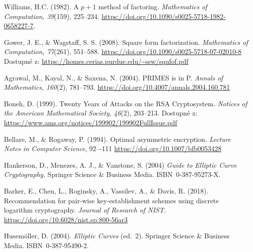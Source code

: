 \documentclass[
  program=infoi,
  biblatex=false,
  figures=true,
  glossaries,
  tables=false,
  sourcecodes=true,
  index
]{kidiplom}
\begin{document}
\begin{thebibliography}{99}
        Williams, H.C. (1982).
        A $p+1$ method of factoring.
        \emph{Mathematics of Computation, 39}(159), 225--234.
        \url{https://doi.org/10.1090/s0025-5718-1982-0658227-7}.

        Gower, J. E., \& Wagstaff, S. S. (2008).
        Square form factorization.
        \emph{Mathematics of Computation, 77}(261), 551–588.
        \url{https://doi.org/10.1090/s0025-5718-07-02010-8}
        Dostupné z: \url{https://homes.cerias.purdue.edu/~ssw/squfof.pdf}

        Agrawal, M., Kayal, N., \& Saxena, N. (2004).
        PRIMES is in P.
        \emph{Annals of Mathematics, 160}(2), 781–793.
        \url{https://doi.org/10.4007/annals.2004.160.781}

        Boneh, D. (1999).
        Twenty Years of Attacks on the RSA Cryptosystem.
        \emph{Notices of the American Mathematical Society, 46}(2), 203--213.
        Dostupné z: \url{https://www.ams.org/notices/199902/199902FullIssue.pdf}

        Bellare, M., \& Rogaway, P. (1994).
        Optimal asymmetric encryption.
        \emph{Lecture Notes in Computer Science}, 92–-111
        \url{https://doi.org/10.1007/bfb0053428}

        Hankerson, D., Menezes, A. J., \& Vanstone, S. (2004)
        \emph{Guide to Elliptic Curve Cryptography.}
        Springer Science \& Business Media.
        ISBN~0-387-95273-X.

        Barker, E., Chen, L., Roginsky, A., Vassilev, A., \& Davis, R. (2018).
        Recommendation for pair-wise key-establishment schemes using discrete logarithm cryptography.
        \emph{Journal of Research of NIST}.
        \url{https://doi.org/10.6028/nist.sp.800-56ar3}

        Husemöller, D. (2004).
        \emph{Elliptic Curves} (ed.~2).
        Springer Science \& Business Media.
        ISBN~0-387-95490-2.

    

\end{thebibliography}
\end{document}
